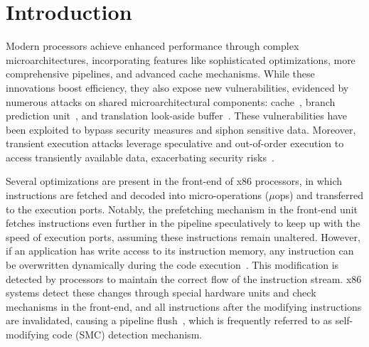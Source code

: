 \section{Introduction}

Modern processors achieve enhanced performance through complex microarchitectures, incorporating features like sophisticated optimizations, more comprehensive pipelines, and advanced cache mechanisms. While these innovations boost efficiency, they also expose new vulnerabilities, evidenced by numerous attacks on shared microarchitectural components: cache~\cite{irazoqui2014wait,gruss2016flush+,zhang2012cross}, branch prediction unit~\cite{evtyushkin2018branchscope}, and translation look-aside buffer~\cite{gras2018translation}. These vulnerabilities have been exploited to bypass security measures and siphon sensitive data. Moreover, transient execution attacks leverage speculative and out-of-order execution to access transiently available data, exacerbating security risks~\cite{kocher2020spectre,lipp2020meltdown}. 

Several optimizations are present in the front-end of x86 processors, in which instructions are fetched and decoded into micro-operations ($\mu$ops) and transferred to the execution ports. Notably, the prefetching mechanism in the front-end unit fetches instructions even further in the pipeline speculatively to keep up with the speed of execution ports, assuming these instructions remain unaltered. However, if an application has write access to its instruction memory, any instruction can be overwritten dynamically during the code execution~\cite{ansel2011language}. This modification is detected by processors to maintain the correct flow of the instruction stream. x86 systems detect these changes through special hardware units and check mechanisms in the front-end, and all instructions after the modifying instructions are invalidated, causing a pipeline flush~\cite{kyker2003method,self_amd}, which is frequently referred to as self-modifying code (SMC) detection mechanism.

